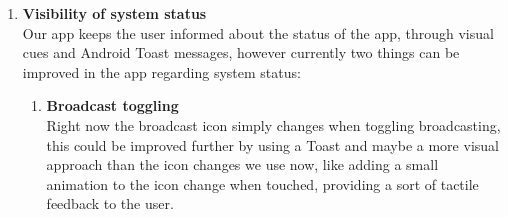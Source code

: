 \documentclass[runningheads,a4paper]{llncs}
\begin{document}
\begin{enumerate}
  \item \textbf{Visibility of system status}\\
  Our app keeps the user informed about the status of the app, through visual cues and Android Toast messages, however currently two things can be improved in the app regarding system status:
  \begin{enumerate}
    \item \textbf{Broadcast toggling}\\
    Right now the broadcast icon simply changes when toggling broadcasting, this could be improved further by using a Toast and maybe a more visual approach than the icon changes we use now, like adding a small animation to the icon change when touched, providing a sort of tactile feedback to the user.
    

\end{enumerate}
\end{enumerate}
\end{document}
